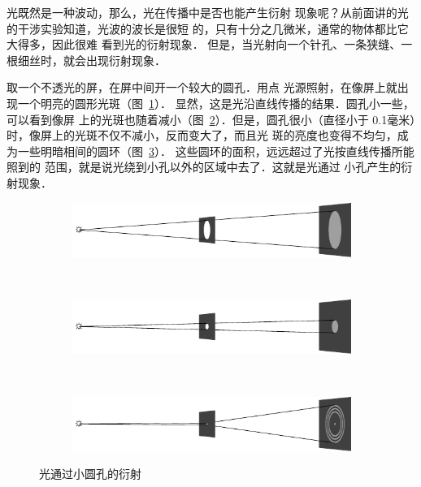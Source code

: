 光既然是一种波动，那么，光在传播中是否也能产生衍射
现象呢？从前面讲的光的干涉实验知道，光波的波长是很短
的，只有十分之几微米，通常的物体都比它大得多，因此很难
看到光的衍射现象．
但是，当光射向一个针孔、一条狭缝、一
根细丝时，就会出现衍射现象．

取一个不透光的屏，在屏中间开一个较大的圆孔．用点
光源照射，在像屏上就出现一个明亮的圆形光斑（图~\ref{fig_C_6-7a}）．
显然，这是光沿直线传播的结果．圆孔小一些，可以看到像屏
上的光斑也随着减小（图~\ref{fig_C_6-7b}）．但是，圆孔很小（直径小于
0.1毫米）时，像屏上的光斑不仅不减小，反而变大了，而且光
斑的亮度也变得不均匀，成为一些明暗相间的圆环（图~\ref{fig_C_6-7c}）．
这些圆环的面积，远远超过了光按直线传播所能照到的
范围，就是说光绕到小孔以外的区域中去了．这就是光通过
小孔产生的衍射现象．
\begin{figure}[htbp]
    \centering
    \begin{subfigure}{0.8\linewidth}
        \centering
        \includegraphics{fig/C/6-7a.pdf}
        \caption{}\label{fig_C_6-7a}
    \end{subfigure}
    \\
    \begin{subfigure}{0.8\linewidth}
        \centering
        \includegraphics{fig/C/6-7b.pdf}
        \caption{}\label{fig_C_6-7b}
    \end{subfigure}
    \\
    \begin{subfigure}{0.8\linewidth}
        \centering
        \includegraphics{fig/C/6-7c.pdf}
        \caption{}\label{fig_C_6-7c}
    \end{subfigure}
    \caption{光通过小圆孔的衍射}\label{fig_C_6-7}
\end{figure}

